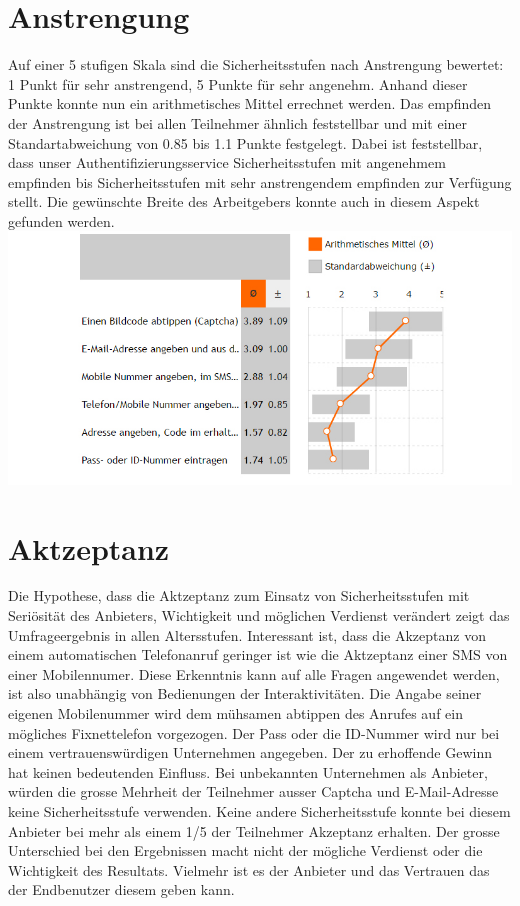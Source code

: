 \section{Anstrengung}\label{anstrengung}

Auf einer 5 stufigen Skala sind die Sicherheitsstufen nach Anstrengung
bewertet: 1 Punkt für sehr anstrengend, 5 Punkte für sehr angenehm.
Anhand dieser Punkte konnte nun ein arithmetisches Mittel errechnet
werden. Das empfinden der Anstrengung ist bei allen Teilnehmer ähnlich
feststellbar und mit einer Standartabweichung von 0.85 bis 1.1 Punkte
festgelegt. Dabei ist feststellbar, dass unser Authentifizierungsservice
Sicherheitsstufen mit angenehmem empfinden bis Sicherheitsstufen mit
sehr anstrengendem empfinden zur Verfügung stellt. Die gewünschte Breite
des Arbeitgebers konnte auch in diesem Aspekt gefunden werden.
\includegraphics{images/studie/anstrengung.jpg}

\section{Aktzeptanz}\label{aktzeptanz}

Die Hypothese, dass die Aktzeptanz zum Einsatz von Sicherheitsstufen mit
Seriösität des Anbieters, Wichtigkeit und möglichen Verdienst verändert
zeigt das Umfrageergebnis in allen Altersstufen. Interessant ist, dass
die Akzeptanz von einem automatischen Telefonanruf geringer ist wie die
Aktzeptanz einer SMS von einer Mobilennumer. Diese Erkenntnis kann auf
alle Fragen angewendet werden, ist also unabhängig von Bedienungen der
Interaktivitäten. Die Angabe seiner eigenen Mobilenummer wird dem
mühsamen abtippen des Anrufes auf ein mögliches Fixnettelefon
vorgezogen. Der Pass oder die ID-Nummer wird nur bei einem
vertrauenswürdigen Unternehmen angegeben. Der zu erhoffende Gewinn hat
keinen bedeutenden Einfluss. Bei unbekannten Unternehmen als Anbieter,
würden die grosse Mehrheit der Teilnehmer ausser Captcha und
E-Mail-Adresse keine Sicherheitsstufe verwenden. Keine andere
Sicherheitsstufe konnte bei diesem Anbieter bei mehr als einem 1/5 der
Teilnehmer Akzeptanz erhalten. Der grosse Unterschied bei den
Ergebnissen macht nicht der mögliche Verdienst oder die Wichtigkeit des
Resultats. Vielmehr ist es der Anbieter und das Vertrauen das der
Endbenutzer diesem geben kann.

